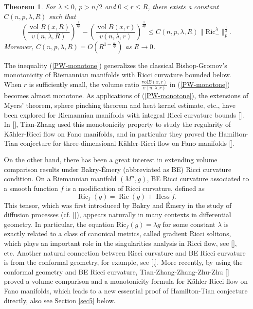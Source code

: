 \documentclass[11pt]{amsart}
\numberwithin{equation}{section}
\newtheorem{theorem}{Theorem}[section]
\newcommand{\vol}{\mathrm{vol}}
\begin{document}
    \begin{theorem}\label{PW}
    	For $\lambda\leq 0$, $p>n/2$ and $0<r\leq R$, there exists a constant $C(n,p,\lambda,R)$ such that
    	\begin{equation}\label{PW-monotone}
    	\left(\frac{\operatorname{vol}B(x,R)}{v(n,\lambda,R)}\right)^{\frac1{2p}}-\left(\frac{\operatorname{vol}B(x,r)}{v(n,\lambda,r)}\right)^{\frac1{2p}}
    	\leq C(n,p,\lambda,R)\|\mathrm{Ric}^\lambda_-\|_p^{\frac{1}{2}}.
    	\end{equation}
    	Moreover, $C(n,p,\lambda,R)=O(R^{1-\frac{n}{2p}})$ as $R\to 0$.
    \end{theorem}
    The  inequality  (\ref{PW-monotone})  generalizes the classical Bishop-Gromov's monotonicity of  Riemannian manifolds with Ricci curvature bounded below. When $r$ is sufficiently small, the volume ratio $\frac{\vol B(x,r)}{v(n,\lambda,r)}$ in (\ref{PW-monotone})  becomes almost monotone. As applications of (\ref{PW-monotone}),  the extensions of Myers'  theorem,  sphere pinching theorem  and heat kernel estimate, etc.,   have  been explored  for Riemannian manifolds with integral Ricci curvature bounds [\cite{PS, PW2}]. In [\cite{TZhangZ}], Tian-Zhang used this monotonicity property to study  the regularity of K\"{a}hler-Ricci flow on  Fano manifolds, and in particular  they proved the Hamilton-Tian conjecture   for    three-dimensional  K\"{a}hler-Ricci flow on  Fano manifolds [\cite {Ti}].

    On the other hand, there has been a  great interest in extending volume comparison results  under  Bakry-\'{E}mery (abbreviated as BE) Ricci curvature condition.  On a Riemannian manifold $(M^n,g)$,   BE Ricci curvature associated to a smooth function $f$ is a modification of Ricci curvature, defined as
    \begin{equation}\label{potential}
    	\operatorname{Ric}_f(g)=\operatorname{Ric}(g)+\operatorname{Hess}f.
    \end{equation}
    This tensor,  which was first  introduced by Bakry and \'{E}mery in the study of diffusion processes (cf. [\cite{BE,  Qi}]),   appears naturally in many contexts in differential geometry.  In particular,  the equation $\mathrm{Ric}_f(g)=\lambda g$ for some constant $\lambda$ is exactly related to  a class of canonical metrics, called   gradient Ricci solitons, which plays an important role in the singularities analysis  in  Ricci flow, see [\cite{Pe, Ha}], etc. Another natural connection between Ricci curvature and BE  Ricci curvature is from the conformal geometry, for example,  see [\cite{TZhangZ1},\cite{WZ}]. More recently, by using the conformal geometry and BE Ricci curvature, Tian-Zhang-Zhang-Zhu-Zhu   [\cite{TZZZZ}] proved a volume comparison and a  monotonicity formula   for K\"{a}hler-Ricci flow on Fano manifolds, which leads to a new essential  proof of Hamilton-Tian conjecture directly,   also  see Section \ref{sec5} below.
\end{document}
